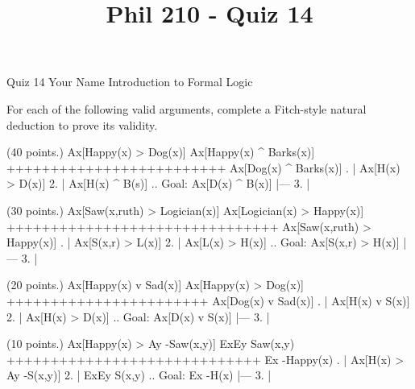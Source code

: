 
\title{Phil 210 - Quiz 14}

\heading
Quiz 14
Your Name
Introduction to Formal Logic
\endheading

For each of the following valid arguments, complete a Fitch-style natural deduction to prove its validity.

\quantifiers
\problems
{} (40 points.)
\argument
 Ax[Happy(x) > Dog(x)]
 Ax[Happy(x) ^ Barks(x)]
+++++++++++++++++++++++++
 Ax[Dog(x) ^ Barks(x)]
\endargument
        \answer
        . | Ax[H(x) > D(x)]
         2. | Ax[H(x) ^ B(s)]  ..  Goal: Ax[D(x) ^ B(x)]
            |---
         3. | 
        \endfitchproof
        \endanswer

 (30 points.)
\argument
 Ax[Saw(x,ruth) > Logician(x)]
 Ax[Logician(x) > Happy(x)]
+++++++++++++++++++++++++++++++
 Ax[Saw(x,ruth) > Happy(x)]
\endargument
        \answer
        . | Ax[S(x,r) > L(x)]
         2. | Ax[L(x) > H(x)]        ..  Goal: Ax[S(x,r) > H(x)]
            |---
         3. | 
        \endfitchproof
        \endanswer

 (20 points.)
\argument
 Ax[Happy(x) v Sad(x)]
 Ax[Happy(x) > Dog(x)]
+++++++++++++++++++++++
 Ax[Dog(x) v Sad(x)]
\endargument
        \answer
        . | Ax[H(x) v S(x)]
         2. | Ax[H(x) > D(x)]      ..  Goal: Ax[D(x) v S(x)]
            |---
         3. | 
        \endfitchproof
        \endanswer

 (10 points.)
\argument
 Ax[Happy(x) > Ay -Saw(x,y)]
 ExEy Saw(x,y)
+++++++++++++++++++++++++++++
 Ex -Happy(x)
\endargument
        \answer
        . | Ax[H(x) > Ay -S(x,y)]
         2. | ExEy S(x,y)                    ..  Goal: Ex -H(x)
            |---
         3. | 
        \endfitchproof
        \endanswer

\endproblems
\bye
